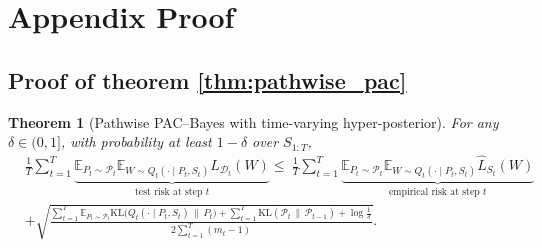 \documentclass{article}
\theoremstyle{plain}
\newtheorem{theorem}{Theorem}[section]
\theoremstyle{definition}
\theoremstyle{remark}
\begin{document}




\clearpage      %
\onecolumn      %
\appendix       %

\section{Appendix Proof}



\subsection{Proof of theorem \ref{thm:pathwise_pac}}
\label{proof:theorem all}

\begin{theorem}[Pathwise PAC--Bayes with time-varying hyper-posterior]
\label{the: full}
For any $\delta\in(0,1]$, with probability at least $1-\delta$ over $S_{1:T}$,
\begin{equation}
\begin{aligned} 
& \frac{1}{T} \sum_{t=1}^T \underbrace{\mathbb{E}_{P_t \sim \mathcal{P}_t} \mathbb{E}_{W \sim Q_t(\cdot \mid P_t, S_t)} L_{\mathcal{D}_t}(W)}_{\text{test risk at step } t} 
\le \ \frac{1}{T} \sum_{t=1}^T \underbrace{\mathbb{E}_{P_t \sim \mathcal{P}_t} \mathbb{E}_{W \sim Q_t(\cdot \mid P_t, S_t)} \hat{L}_{S_t}(W)}_{\text{empirical risk at step } t} \\ 
& + \sqrt{\frac{ \sum_{t=1}^T \mathbb{E}_{P_t \sim \mathcal{P}_t} \mathrm{KL}\big(Q_t(\cdot \mid P_t, S_t) \,\|\, P_t\big) + \sum_{t=1}^T \mathrm{KL}(\mathcal{P}_t \,\|\, \mathcal{P}_{t-1}) + \log\frac{1}{\delta} }{2 \sum_{t=1}^T (m_t - 1)}}. 
\end{aligned} 
\end{equation}
\end{theorem}
\end{document}
